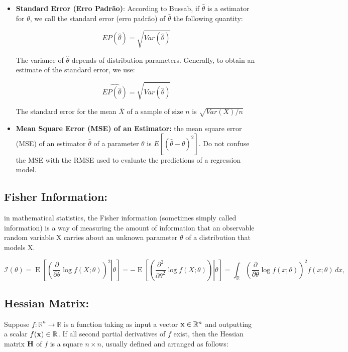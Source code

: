 \begin{itemize}
    \item \textbf{Standard Error (Erro Padrão)}: According to Bussab, if $\hat{\theta}$ is a estimator for $\theta$, we call the standard error (erro padrão) of $\hat{\theta}$ the following quantity:
    
    \begin{equation}
        EP(\hat{\theta}) = \sqrt{Var(\hat{\theta})}
    \end{equation}
    
    The variance of $\hat{\theta}$ depends of distribution parameters. Generally, to obtain an estimate of the standard error, we use:
    
    \begin{equation}
        \hat{EP(\hat{\theta})} = \sqrt{\hat{Var(\hat{\theta})}}
    \end{equation}
    
    The standard error for the mean $\bar{X}$ of a sample of size $n$ is $\sqrt{Var(X)/n}$
    
    \item \textbf{Mean Square Error (MSE) of an Estimator:} the mean square error (MSE) of an estimator $\hat{\theta}$ of a parameter $\theta$ is $E[(\hat{\theta} - \theta)^2]$. Do not confuse the MSE with the RMSE used to evaluate the predictions of a regression model.

\end{itemize}

\subsection{Fisher Information:} in mathematical statistics, the Fisher information (sometimes simply called information) is a way of measuring the amount of information that an observable random variable X carries about an unknown parameter $\theta$ of a distribution that models X.
    
    \begin{equation}
        \mathcal {I}(\theta )=\operatorname {E} \left[\left.\left({\frac {\partial }{\partial \theta }}\log f(X;\theta )\right)^{2}\right|\theta \right]=-\operatorname {E} \left[\left.\left({\frac {\partial^2 }{\partial \theta^2 }}\log f(X;\theta )\right)\right|\theta \right]=\int _{\mathbb {R} }\left({\frac {\partial }{\partial \theta }}\log f(x;\theta )\right)^{2}f(x;\theta )\,dx,
    \end{equation}
    
\subsection{Hessian Matrix:} Suppose $f:\mathbb{R}^n \to \mathbb{R}$ is a function taking as input a vector $\bold{x} \in \mathbb{R}^n$ and outputting a scalar $f(\bold{x}) \in \mathbb{R}$. If all second partial derivatives of $f$ exist, then the Hessian matrix $\bold{H}$ of $f$ is a square $n \times n$, usually defined and arranged as follows:
    
